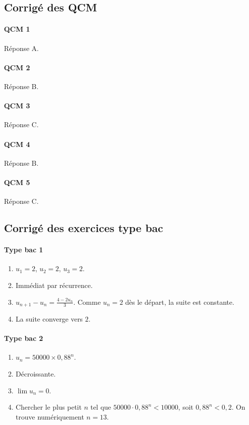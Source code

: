 \documentclass[11pt,a4paper]{article}
\theoremstyle{definition}
\begin{document}
\subsection{Corrigé des QCM}

\paragraph{QCM 1} Réponse A.

\paragraph{QCM 2} Réponse B.

\paragraph{QCM 3} Réponse C.

\paragraph{QCM 4} Réponse B.

\paragraph{QCM 5} Réponse C.

\subsection{Corrigé des exercices type bac}

\paragraph{Type bac 1}
\begin{enumerate}[label=\arabic*.]
    \item $u_1=2$, $u_2=2$, $u_3=2$.
    \item Immédiat par récurrence.
    \item $u_{n+1}-u_n=\frac{4-2u_n}{3}$. Comme $u_n=2$ dès le départ, la suite est constante.
    \item La suite converge vers $2$.
\end{enumerate}

\paragraph{Type bac 2}
\begin{enumerate}[label=\arabic*.]
    \item $u_n=50000\times 0{,}88^n$.
    \item Décroissante.
    \item $\lim u_n=0$.
    \item Chercher le plus petit $n$ tel que $50000\cdot 0{,}88^n<10000$, soit $0{,}88^n<0{,}2$. On trouve numériquement $n=13$.
\end{enumerate}
\end{document}
